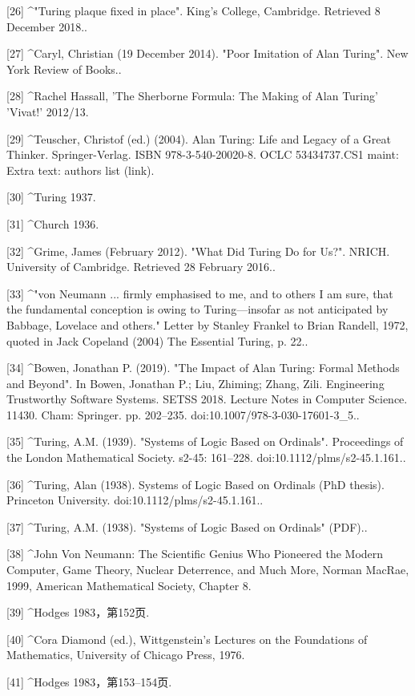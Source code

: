 [26]
^"Turing plaque fixed in place". King's College, Cambridge. Retrieved 8 December 2018..

[27]
^Caryl, Christian (19 December 2014). "Poor Imitation of Alan Turing". New York Review of Books..

[28]
^Rachel Hassall, 'The Sherborne Formula: The Making of Alan Turing' 'Vivat!' 2012/13.

[29]
^Teuscher, Christof (ed.) (2004). Alan Turing: Life and Legacy of a Great Thinker. Springer-Verlag. ISBN 978-3-540-20020-8. OCLC 53434737.CS1 maint: Extra text: authors list (link).

[30]
^Turing 1937.

[31]
^Church 1936.

[32]
^Grime, James (February 2012). "What Did Turing Do for Us?". NRICH. University of Cambridge. Retrieved 28 February 2016..

[33]
^"von Neumann ... firmly emphasised to me, and to others I am sure, that the fundamental conception is owing to Turing—insofar as not anticipated by Babbage, Lovelace and others." Letter by Stanley Frankel to Brian Randell, 1972, quoted in Jack Copeland (2004) The Essential Turing, p. 22..

[34]
^Bowen, Jonathan P. (2019). "The Impact of Alan Turing: Formal Methods and Beyond". In Bowen, Jonathan P.; Liu, Zhiming; Zhang, Zili. Engineering Trustworthy Software Systems. SETSS 2018. Lecture Notes in Computer Science. 11430. Cham: Springer. pp. 202–235. doi:10.1007/978-3-030-17601-3_5..

[35]
^Turing, A.M. (1939). "Systems of Logic Based on Ordinals". Proceedings of the London Mathematical Society. s2-45: 161–228. doi:10.1112/plms/s2-45.1.161..

[36]
^Turing, Alan (1938). Systems of Logic Based on Ordinals (PhD thesis). Princeton University. doi:10.1112/plms/s2-45.1.161..

[37]
^Turing, A.M. (1938). "Systems of Logic Based on Ordinals" (PDF)..

[38]
^John Von Neumann: The Scientific Genius Who Pioneered the Modern Computer, Game Theory, Nuclear Deterrence, and Much More, Norman MacRae, 1999, American Mathematical Society, Chapter 8.

[39]
^Hodges 1983，第152页.

[40]
^Cora Diamond (ed.), Wittgenstein's Lectures on the Foundations of Mathematics, University of Chicago Press, 1976.

[41]
^Hodges 1983，第153–154页.


